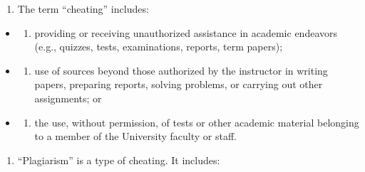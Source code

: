 \begin{enumerate}
\def\labelenumi{\arabic{enumi}.}
\tightlist
\item
  The term ``cheating'' includes:
\end{enumerate}

\begin{itemize}
\item
  \begin{enumerate}
  \def\labelenumi{(\alph{enumi})}
  \tightlist
  \item
    providing or receiving unauthorized assistance in academic endeavors (e.g., quizzes, tests, examinations, reports, term papers);
  \end{enumerate}
\item
  \begin{enumerate}
  \def\labelenumi{(\alph{enumi})}
  \setcounter{enumi}{1}
  \tightlist
  \item
    use of sources beyond those authorized by the instructor in writing papers, preparing reports, solving problems, or carrying out other assignments; or
  \end{enumerate}
\item
  \begin{enumerate}
  \def\labelenumi{(\alph{enumi})}
  \setcounter{enumi}{2}
  \tightlist
  \item
    the use, without permission, of tests or other academic material belonging to a member of the University faculty or staff.
  \end{enumerate}
\end{itemize}

\begin{enumerate}
\def\labelenumi{\arabic{enumi}.}
\setcounter{enumi}{1}
\tightlist
\item
  ``Plagiarism'' is a type of cheating. It includes:
\end{enumerate}

